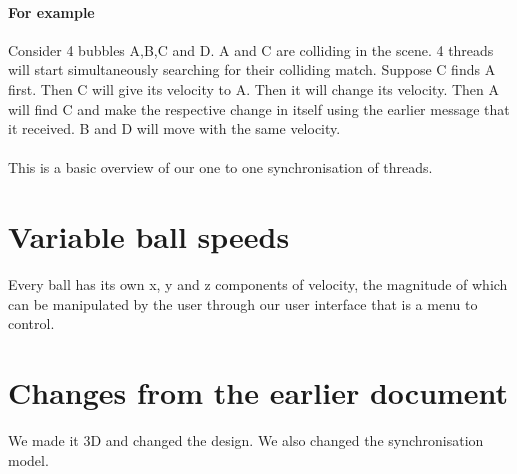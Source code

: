 \documentclass{article}
\begin{document}
	\paragraph{For example}
	Consider 4 bubbles A,B,C and D. A and C are colliding in the scene. 4 threads will start simultaneously searching for their colliding match. Suppose C finds A first. Then C will give its velocity to A. Then it will change its velocity. Then A will find C and make the respective change in itself using the earlier message that it received. B and D will move with the same velocity.
	\paragraph{}
	This is a basic overview of our one to one synchronisation of threads.
	\section{Variable ball speeds}
	 Every ball has its own x, y and z components of velocity, the magnitude of which can be manipulated by the user through our user interface that is a menu to control.

	\section{Changes from the earlier document}
	We made it 3D and changed the design. 
	We also changed the synchronisation model.
\end{document}
